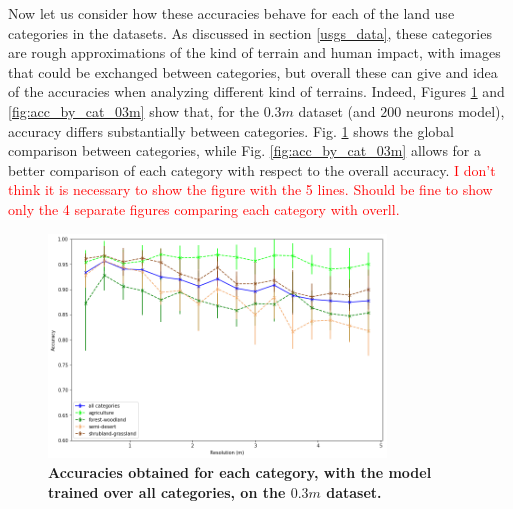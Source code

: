 Now let us consider how these accuracies behave for each of the land use categories in the datasets. As discussed in section \ref{usgs_data}, these categories are rough approximations of the kind of terrain and human impact, with images that could be exchanged between categories, but overall these can give and idea of the accuracies when analyzing different kind of terrains. Indeed, Figures \ref{fig:acc_all_cat_03m} and \ref{fig:acc_by_cat_03m} show that, for the $0.3m$ dataset (and $200$ neurons model), accuracy differs substantially between categories. Fig. \ref{fig:acc_all_cat_03m} shows the global comparison between categories, while Fig. \ref{fig:acc_by_cat_03m} allows for a better comparison of each category with respect to the overall accuracy. \textcolor{red}{I don't think it is necessary to show the figure with the 5 lines. Should be fine to show only the 4 separate figures comparing each category with overll.}

\begin{figure}[h!]
	\centering
	\includegraphics[width=0.8\textwidth]{Figures/results/acc_res_all_categories_03m.png}
	\captionsetup{width=1\linewidth}
	\caption{\textbf{Accuracies obtained for each category, with the model trained over all categories, on the $0.3m$ dataset.}}
	\label{fig:acc_all_cat_03m}
\end{figure}

